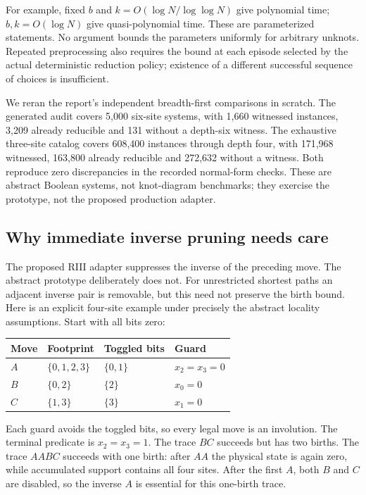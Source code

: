 For example, fixed $b$ and $k=O(\log N/\log\log N)$ give polynomial time;
$b,k=O(\log N)$ give quasi-polynomial time.  These are parameterized
statements.  No argument bounds the parameters uniformly for arbitrary
unknots.  Repeated preprocessing also requires the bound at each episode
selected by the actual deterministic reduction policy; existence of a
different successful sequence of choices is insufficient.

We reran the report's independent breadth-first comparisons in scratch.
The generated audit covers 5,000 six-site systems, with 1,660 witnessed
instances, 3,209 already reducible and 131 without a depth-six witness.
The exhaustive three-site catalog covers 608,400 instances through depth
four, with 171,968 witnessed, 163,800 already reducible and 272,632 without
a witness.  Both reproduce zero discrepancies in the recorded normal-form
checks.  These are abstract Boolean systems, not knot-diagram benchmarks;
they exercise the prototype, not the proposed production adapter.

\subsection{Why immediate inverse pruning needs care}
The proposed RIII adapter suppresses the inverse of the preceding move.
The abstract prototype deliberately does not.  For unrestricted shortest
paths an adjacent inverse pair is removable, but this need not preserve
the birth bound.  Here is an explicit four-site example under precisely
the abstract locality assumptions.  Start with all bits zero:
\begin{center}
\begin{tabular}{llll}
\toprule
Move & Footprint & Toggled bits & Guard\\
\midrule
$A$ & $\{0,1,2,3\}$ & $\{0,1\}$ & $x_2=x_3=0$\\
$B$ & $\{0,2\}$ & $\{2\}$ & $x_0=0$\\
$C$ & $\{1,3\}$ & $\{3\}$ & $x_1=0$\\
\bottomrule
\end{tabular}
\end{center}
Each guard avoids the toggled bits, so every legal move is an involution.
The terminal predicate is $x_2=x_3=1$.  The trace $BC$ succeeds but has
two births.  The trace $AABC$ succeeds with one birth: after $AA$ the
physical state is again zero, while accumulated support contains all four
sites.  After the first $A$, both $B$ and $C$ are disabled, so the inverse
$A$ is essential for this one-birth trace.

